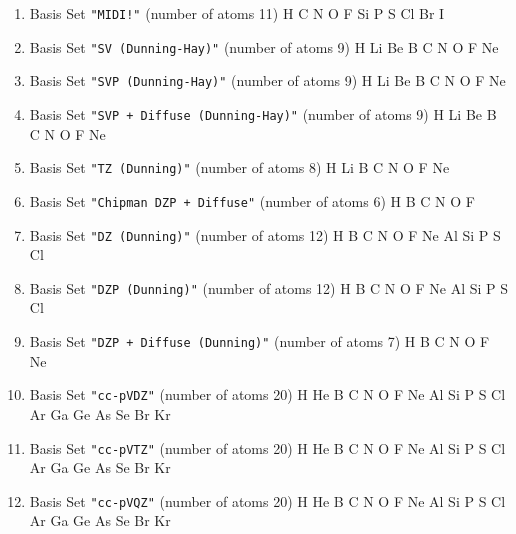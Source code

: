 \begin{enumerate}
\item Basis Set \verb#"MIDI!"# (number of atoms 11)  \newline 
  H C N O F Si P S Cl Br I


\item Basis Set \verb#"SV (Dunning-Hay)"# (number of atoms 9)  \newline 
  H Li Be B C N O F Ne


\item Basis Set \verb#"SVP (Dunning-Hay)"# (number of atoms 9)  \newline 
  H Li Be B C N O F Ne


\item Basis Set \verb#"SVP + Diffuse (Dunning-Hay)"# (number of atoms 9)  \newline 
  H Li Be B C N O F Ne


\item Basis Set \verb#"TZ (Dunning)"# (number of atoms 8)  \newline 
  H Li B C N O F Ne


\item Basis Set \verb#"Chipman DZP + Diffuse"# (number of atoms 6)  \newline 
  H B C N O F


\item Basis Set \verb#"DZ (Dunning)"# (number of atoms 12)  \newline 
  H B C N O F Ne Al Si P S Cl


\item Basis Set \verb#"DZP (Dunning)"# (number of atoms 12)  \newline 
  H B C N O F Ne Al Si P S Cl


\item Basis Set \verb#"DZP + Diffuse (Dunning)"# (number of atoms 7)  \newline 
  H B C N O F Ne


\item Basis Set \verb#"cc-pVDZ"# (number of atoms 20)  \newline 
  H He B C N O F Ne Al Si P S Cl Ar Ga Ge As Se Br Kr


\item Basis Set \verb#"cc-pVTZ"# (number of atoms 20)  \newline 
  H He B C N O F Ne Al Si P S Cl Ar Ga Ge As Se Br Kr


\item Basis Set \verb#"cc-pVQZ"# (number of atoms 20)  \newline 
  H He B C N O F Ne Al Si P S Cl Ar Ga Ge As Se Br Kr



\end{enumerate}
